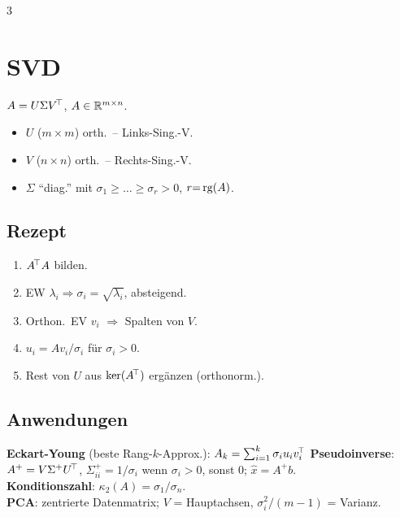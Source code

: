 \documentclass[8pt,a4paper]{extarticle}
\begin{document}
\begin{multicols*}{3}
\section{SVD}
$A=U\Sigma V^{\!\top}$, $A\in\mathbb{R}^{m\times n}$.
\begin{itemize}
\item $U$ ($m{\times}m$) orth.\ -- Links-Sing.-V.
\item $V$ ($n{\times}n$) orth.\ -- Rechts-Sing.-V.
\item $\Sigma$ ``diag.'' mit $\sigma_1\!\ge\!\dots\!\ge\!\sigma_r>0$, $r{=}\operatorname{rg}(A)$.
\end{itemize}

\subsection{Rezept}
\begin{enumerate}
\item $A^{\!\top} A$ bilden.
\item EW $\lambda_i\Rightarrow\sigma_i=\sqrt{\lambda_i}$, absteigend.
\item Orthon.\ EV $v_i$ $\Rightarrow$ Spalten von $V$.
\item $u_i=Av_i/\sigma_i$ f\"ur $\sigma_i>0$.
\item Rest von $U$ aus $\ker(A^{\!\top})$ erg\"anzen (orthonorm.).
\end{enumerate}

\subsection{Anwendungen}
\textbf{Eckart-Young} (beste Rang-$k$-Approx.): $A_k=\sum_{i=1}^k\sigma_i u_i v_i^{\!\top}$
\textbf{Pseudoinverse}: $A^+=V\Sigma^+U^{\!\top}$, $\Sigma^+_{ii}=1/\sigma_i$ wenn $\sigma_i\!>\!0$, sonst $0$; $\hat x=A^+ b$.\\
\textbf{Konditionszahl}: $\kappa_2(A)=\sigma_1/\sigma_n$.\\
\textbf{PCA}: zentrierte Datenmatrix; $V$ = Hauptachsen, $\sigma_i^2/(m{-}1)$ = Varianz.


\end{multicols*}
\end{document}
